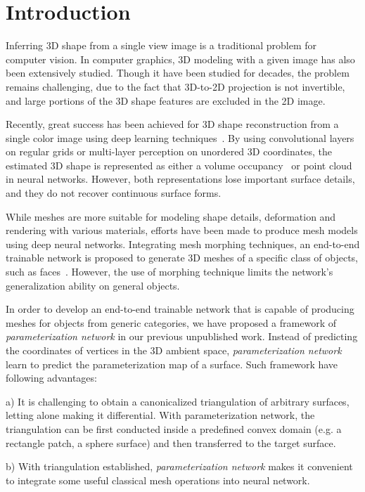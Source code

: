 \section{Introduction}
Inferring 3D shape from a single view image is a traditional problem for computer vision. In computer graphics, 3D modeling with a given image has also been extensively studied. 
Though it have been studied for decades, the problem remains challenging, due to the fact that 3D-to-2D projection is not invertible, and large portions of the 3D shape features are excluded in the 2D image. 

Recently, great success has been achieved for 3D shape reconstruction from a single color image using deep learning techniques~\cite{3DR2N2,PSGN}. 
By using convolutional layers on regular grids or multi-layer
perception on unordered 3D coordinates, the estimated 3D shape is represented
as either a volume occupancy~\cite{3DR2N2} or point cloud~\cite{PSGN} in neural networks. 
However, both representations lose important surface details, and they do not recover continuous surface forms.

While meshes are more suitable for modeling shape details, deformation and rendering with various materials, efforts have been made to produce mesh models using deep neural networks. 
Integrating mesh morphing techniques, an end-to-end trainable network is proposed to generate 3D meshes of a specific class of objects, such as faces~\cite{endface}.
However, the use of morphing technique limits the network's generalization ability on general objects.
%

In order to develop an end-to-end trainable network that is capable of producing meshes for objects from generic categories, we have proposed a framework of \emph{parameterization network} in our previous unpublished work. Instead of predicting the coordinates of vertices in the 3D ambient space, \emph{parameterization network} learn to predict the parameterization map of a surface.
Such framework have following advantages:

a) It is challenging to obtain a canonicalized triangulation of arbitrary surfaces, letting alone making it differential. With parameterization network, the triangulation can be first conducted inside a predefined convex domain (e.g. a rectangle patch, a sphere surface) and then transferred to the target surface.

b) With triangulation established, \emph{parameterization network} makes it convenient to integrate some useful classical mesh operations into neural network.

